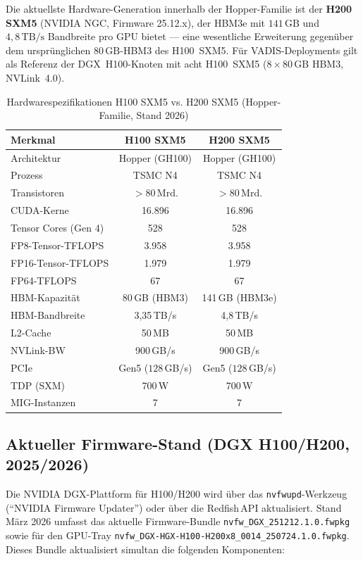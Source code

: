 ﻿\documentclass[12pt,a4paper]{article}
\begin{document}
Die aktuellste Hardware-Generation innerhalb der Hopper-Familie
ist der \textbf{H200 SXM5} (NVIDIA NGC, Firmware 25.12.x),
der HBM3e mit $141\,\text{GB}$ und $4{,}8\,\text{TB/s}$
Bandbreite pro GPU bietet --- eine wesentliche Erweiterung
gegenüber dem ursprünglichen $80\,\text{GB}$-HBM3 des H100~SXM5.
Für VADIS-Deployments gilt als Referenz der DGX~H100-Knoten
mit acht H100~SXM5 ($8 \times 80\,\text{GB}$ HBM3, NVLink~4.0).

\begin{table}[ht]
\centering
\small
\caption{Hardwarespezifikationen H100 SXM5 vs. H200 SXM5 (Hopper-Familie, Stand 2026)}
\label{tab:h100_specs}
\begin{tabular}{@{}lcc@{}}
\toprule
\textbf{Merkmal} & \textbf{H100 SXM5} & \textbf{H200 SXM5} \\
\midrule
Architektur & Hopper (GH100) & Hopper (GH100) \\
Prozess & TSMC N4 & TSMC N4 \\
Transistoren & $>80\,\text{Mrd.}$ & $>80\,\text{Mrd.}$ \\
CUDA-Kerne & 16.896 & 16.896 \\
Tensor Cores (Gen 4) & 528 & 528 \\
FP8-Tensor-TFLOPS & 3.958 & 3.958 \\
FP16-Tensor-TFLOPS & 1.979 & 1.979 \\
FP64-TFLOPS & 67 & 67 \\
HBM-Kapazität & 80\,GB (HBM3) & 141\,GB (HBM3e) \\
HBM-Bandbreite & 3,35\,TB/s & 4,8\,TB/s \\
L2-Cache & 50\,MB & 50\,MB \\
NVLink-BW & 900\,GB/s & 900\,GB/s \\
PCIe & Gen5 ($128$\,GB/s) & Gen5 ($128$\,GB/s) \\
TDP (SXM) & 700\,W & 700\,W \\
MIG-Instanzen & 7 & 7 \\
\bottomrule
\end{tabular}
\end{table}

\subsection{Aktueller Firmware-Stand (DGX H100/H200, 2025/2026)}
\label{sub:h100_firmware}

Die NVIDIA DGX-Plattform für H100/H200 wird über das
\texttt{nvfwupd}-Werkzeug (``NVIDIA Firmware Updater'') oder
über die Redfish\,API aktualisiert. Stand März 2026 umfasst
das aktuelle Firmware-Bundle \texttt{nvfw\_DGX\_251212.1.0.fwpkg}
sowie für den GPU-Tray \texttt{nvfw\_DGX-HGX-H100-H200x8\_0014\_250724.1.0.fwpkg}.
Dieses Bundle aktualisiert simultan die folgenden Komponenten:
\end{document}
